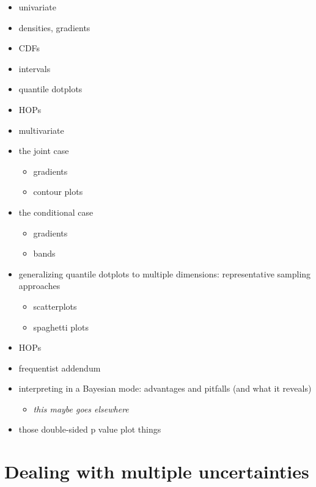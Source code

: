 \documentclass[]{book}
\providecommand{\tightlist}{%
  \setlength{\itemsep}{0pt}\setlength{\parskip}{0pt}}
\theoremstyle{definition}
\theoremstyle{definition}
\theoremstyle{definition}
\theoremstyle{remark}
\begin{document}
\begin{itemize}
\item
  univariate
\item
  densities, gradients
\item
  CDFs
\item
  intervals
\item
  quantile dotplots
\item
  HOPs
\item
  multivariate
\item
  the joint case

  \begin{itemize}
  \tightlist
  \item
    gradients
  \item
    contour plots
  \end{itemize}
\item
  the conditional case

  \begin{itemize}
  \tightlist
  \item
    gradients
  \item
    bands
  \end{itemize}
\item
  generalizing quantile dotplots to multiple dimensions: representative
  sampling approaches

  \begin{itemize}
  \tightlist
  \item
    scatterplots
  \item
    spaghetti plots
  \end{itemize}
\item
  HOPs
\item
  frequentist addendum
\item
  interpreting in a Bayesian mode: advantages and pitfalls (and what it
  reveals)

  \begin{itemize}
  \tightlist
  \item
    \emph{this maybe goes elsewhere}
  \end{itemize}
\item
  those double-sided p value plot things
\end{itemize}

\chapter{Dealing with multiple uncertainties}\label{ch-multiple}
\end{document}
